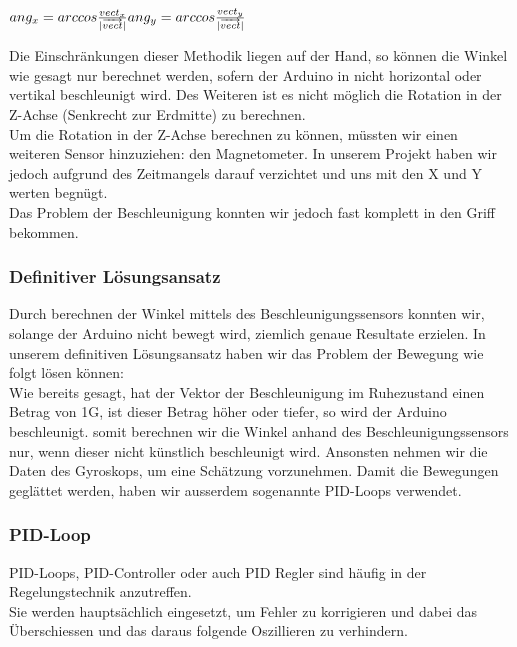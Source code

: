 \vspace{5mm}
\begin{math}
ang_x = arccos{\frac{vect_x}{\lvert\overrightarrow{vect}\rvert}}\\
ang_y = arccos{\frac{vect_y}{\lvert\overrightarrow{vect}\rvert}}
\end{math}
\vspace{5mm}

Die Einschränkungen dieser Methodik liegen auf der Hand, so können die Winkel wie gesagt nur berechnet werden, sofern der Arduino in nicht horizontal oder vertikal beschleunigt wird.
Des Weiteren ist es nicht möglich die Rotation in der Z-Achse (Senkrecht zur Erdmitte) zu berechnen.\\
Um die Rotation in der Z-Achse berechnen zu können, müssten wir einen weiteren Sensor hinzuziehen: den Magnetometer. 
In unserem Projekt haben wir jedoch aufgrund des Zeitmangels darauf verzichtet und uns mit den X und Y werten begnügt.\\
Das Problem der Beschleunigung konnten wir jedoch fast komplett in den Griff bekommen.

\newpage
\subsubsection{Definitiver Lösungsansatz}
Durch berechnen der Winkel mittels des Beschleunigungssensors konnten wir, solange der Arduino nicht bewegt wird, ziemlich genaue Resultate erzielen.
In unserem definitiven Lösungsansatz haben wir das Problem der Bewegung wie folgt lösen können:\\
Wie bereits gesagt, hat der Vektor der Beschleunigung im Ruhezustand einen Betrag von 1G, ist dieser Betrag höher oder tiefer, so wird der Arduino beschleunigt.
somit berechnen wir die Winkel anhand des Beschleunigungssensors nur, wenn dieser nicht künstlich beschleunigt wird.
Ansonsten nehmen wir die Daten des Gyroskops, um eine Schätzung vorzunehmen.
Damit die Bewegungen geglättet werden, haben wir ausserdem sogenannte PID-Loops verwendet.


\subsubsection{PID-Loop}
PID-Loops, PID-Controller oder auch PID Regler sind häufig in der Regelungstechnik anzutreffen.\\
Sie werden hauptsächlich eingesetzt, um Fehler zu korrigieren und dabei das Überschiessen und das daraus folgende Oszillieren zu verhindern.\\

